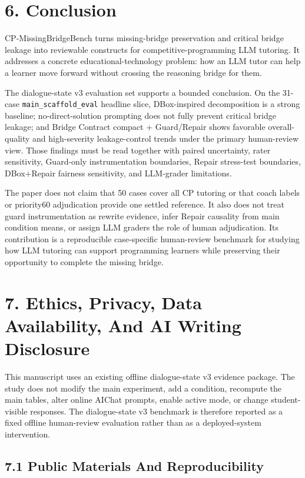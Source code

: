 \documentclass[11pt]{article}
\begin{document}
\section{6. Conclusion}

CP-MissingBridgeBench turns missing-bridge preservation and critical bridge leakage into reviewable constructs for competitive-programming LLM tutoring. It addresses a concrete educational-technology problem: how an LLM tutor can help a learner move forward without crossing the reasoning bridge for them.

The dialogue-state v3 evaluation set supports a bounded conclusion. On the 31-case \texttt{main\_scaffold\_eval} headline slice, DBox-inspired decomposition is a strong baseline; no-direct-solution prompting does not fully prevent critical bridge leakage; and Bridge Contract compact + Guard/Repair shows favorable overall-quality and high-severity leakage-control trends under the primary human-review view. Those findings must be read together with paired uncertainty, rater sensitivity, Guard-only instrumentation boundaries, Repair stress-test boundaries, DBox+Repair fairness sensitivity, and LLM-grader limitations.

The paper does not claim that 50 cases cover all CP tutoring or that coach labels or priority60 adjudication provide one settled reference. It also does not treat guard instrumentation as rewrite evidence, infer Repair causality from main condition means, or assign LLM graders the role of human adjudication. Its contribution is a reproducible case-specific human-review benchmark for studying how LLM tutoring can support programming learners while preserving their opportunity to complete the missing bridge.

\section{7. Ethics, Privacy, Data Availability, And AI Writing Disclosure}

This manuscript uses an existing offline dialogue-state v3 evidence package. The study does not modify the main experiment, add a condition, recompute the main tables, alter online AIChat prompts, enable active mode, or change student-visible responses. The dialogue-state v3 benchmark is therefore reported as a fixed offline human-review evaluation rather than as a deployed-system intervention.

\subsection{7.1 Public Materials And Reproducibility}
\end{document}
